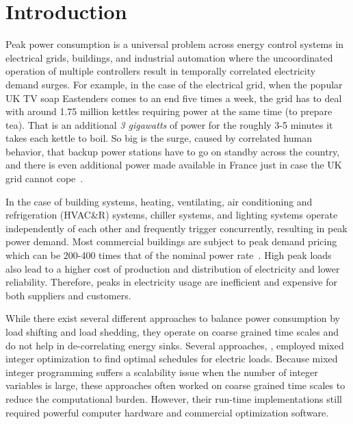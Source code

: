 \section{Introduction}
\label{sec:intro}

Peak power consumption is a universal problem across energy control systems in electrical grids, buildings, %
and industrial automation where the uncoordinated operation of multiple controllers result in  temporally correlated electricity demand surges. For example, in the case of the electrical grid, when the popular UK TV soap Eastenders comes to an end five times a week, the grid has to deal with around 1.75 million kettles requiring power at the same time (to prepare tea). That is an additional \emph{3 gigawatts} of power for the roughly 3-5 minutes it takes each kettle to boil. So big is the surge, caused by correlated human behavior, that backup power stations have to go on standby across the country, and there is even additional power made available in France just in case the UK grid cannot cope~\cite{tvpickup}. 

In the case of building systems, %
heating, ventilating, air conditioning and refrigeration (HVAC\&R) systems, chiller systems, and lighting systems operate independently of each other and frequently trigger concurrently, resulting in peak power demand. Most commercial buildings are subject to peak demand pricing which can be 200-400 times that of the nominal power rate~\cite{trfpeco}. High peak loads also lead to a higher cost of production and distribution of electricity and lower reliability. Therefore, peaks in electricity usage are inefficient and expensive for both suppliers and customers.


While there exist several different approaches to balance power consumption by load shifting and load shedding, they operate on coarse grained time scales and do not help in de-correlating energy sinks.
Several approaches, \eg \cite{sou2011scheduling,zhang2011optimal}, employed mixed integer optimization to find optimal schedules for electric loads.
Because mixed integer programming suffers a scalability issue when the number of integer variables is large, these approaches often worked on coarse grained time scales to reduce the computational burden.
However, their run-time implementations still required powerful computer hardware and commercial optimization software.

